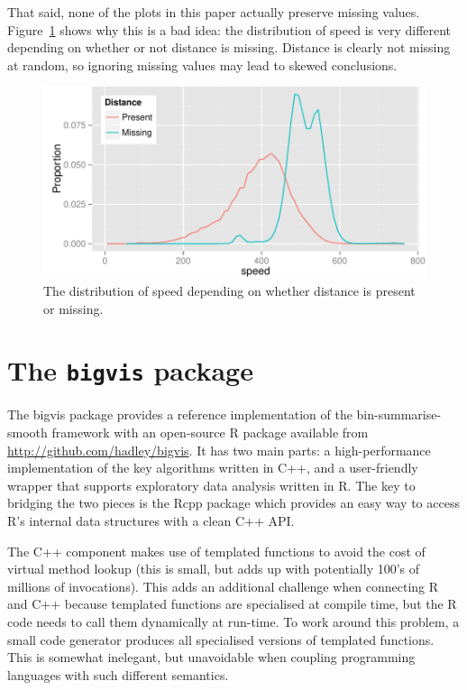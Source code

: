 \documentclass[journal]{vgtc}                %
\begin{document}
That said, none of the plots in this paper actually preserve missing values. Figure~\ref{fig:missing} shows why this is a bad idea: the distribution of speed is very different depending on whether or not distance is missing. Distance is clearly not missing at random, so ignoring missing values may lead to skewed conclusions.

\begin{figure}
  \centering
   \includegraphics[width=\linewidth]{speed-distance}
 \caption{The distribution of speed depending on whether distance is present or missing.}
 \label{fig:missing}
\end{figure}

\section{The {\tt bigvis} package}
\label{sec:bigvis}

The bigvis package provides a reference implementation of the bin-summarise-smooth framework with an open-source R package available from \url{http://github.com/hadley/bigvis}. It has two main parts: a high-performance implementation of the key algorithms written in C++, and a user-friendly wrapper that supports exploratory data analysis written in R. The key to bridging the two pieces is the Rcpp package \citep{eddelbuettel:2011} which provides an easy way to access R's internal data structures with a clean C++ API. 

The C++ component makes use of templated functions to avoid the cost of virtual method lookup (this is small, but adds up with potentially 100's of millions of invocations). This adds an additional challenge when connecting R and C++ because templated functions are specialised at compile time, but the R code needs to call them dynamically at run-time. To work around this problem, a small code generator produces all specialised versions of templated functions. This is somewhat inelegant, but unavoidable when coupling programming languages with such different semantics.
\end{document}
